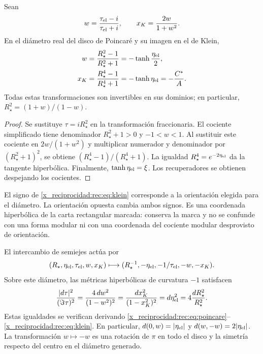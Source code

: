 \begin{theorem}
\label{x_reciprocidad:rec:thm:klein}
Sean
\[
 w=\frac{\tau_{\rm el}-i}{\tau_{\rm el}+i},\qquad
 x_K=\frac{2w}{1+w^2}.
\]
En el diámetro real del disco de Poincaré y su imagen en el de Klein,
\begin{align}
 w&=\frac{R_\star^2-1}{R_\star^2+1}
      =-\tanh\frac{\eta_{\rm el}}2,\label{x_reciprocidad:rec:eq:poincare}\\
 x_K&=\frac{R_\star^4-1}{R_\star^4+1}
      =-\tanh\eta_{\rm el}=-\frac{C^*}{A}.\label{x_reciprocidad:rec:eq:klein}
\end{align}
Todas estas transformaciones son invertibles en sus dominios; en particular,
\(R_\star^2=(1+w)/(1-w)\).
\end{theorem}
\begin{proof}
Se sustituye \(\tau=iR_\star^2\) en la transformación fraccionaria. El cociente simplificado tiene denominador \(R_\star^2+1>0\) y \(-1<w<1\). Al sustituir este cociente en \(2w/(1+w^2)\) y multiplicar numerador y denominador por \((R_\star^2+1)^2\), se obtiene \((R_\star^4-1)/(R_\star^4+1)\). La igualdad \(R_\star^4=e^{-2\eta_{\rm el}}\) da la tangente hiperbólica. Finalmente, \(\tanh\eta_{\rm el}=\xi\). Los recuperadores se obtienen despejando los cocientes.
\end{proof}

El signo de \eqref{x_reciprocidad:rec:eq:klein} corresponde a la orientación elegida para el diámetro. La orientación opuesta cambia ambos signos. Es una coordenada hiperbólica de la carta rectangular marcada: conserva la marca y no se confunde con una forma modular ni con una coordenada del cociente modular desprovisto de orientación.

El intercambio de semiejes actúa por
\begin{equation}
 (R_\star,\eta_{\rm el},\tau_{\rm el},w,x_K)
 \longmapsto(R_\star^{-1},-\eta_{\rm el},-1/\tau_{\rm el},-w,-x_K).
 \label{x_reciprocidad:rec:eq:reciproco-radial}
\end{equation}
Sobre este diámetro, las métricas hiperbólicas de curvatura \(-1\) satisfacen
\begin{equation}
 \frac{|d\tau|^2}{(\Im\tau)^2}
 =\frac{4\,dw^2}{(1-w^2)^2}
 =\frac{dx_K^2}{(1-x_K^2)^2}
 =d\eta_{\rm el}^2=4\frac{dR_\star^2}{R_\star^2}.
 \label{x_reciprocidad:rec:eq:metricas}
\end{equation}
Estas igualdades se verifican derivando \eqref{x_reciprocidad:rec:eq:poincare}--\eqref{x_reciprocidad:rec:eq:klein}. En particular, \(d(0,w)=|\eta_{\rm el}|\) y \(d(w,-w)=2|\eta_{\rm el}|\). La transformación \(w\mapsto-w\) es una rotación de \(\pi\) en todo el disco y la simetría respecto del centro en el diámetro generado.

